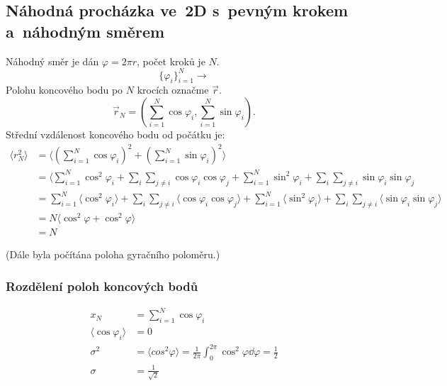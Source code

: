 \documentclass[a4paper]{article}
\begin{document}
\subsection{Náhodná procházka ve~2D s~pevným krokem a~náhod\-ným směrem}
\newcommand\sumN{\sum_{i=1}^N}
\newcommand\mean[1]{\langle #1 \rangle}
Náhodný směr je dán $\varphi = 2 \pi r$, počet kroků je $N$.
\begin{equation}
    \{\varphi_i\}_{i=1}^N \rightarrow
\end{equation}
Polohu koncového bodu po $N$ krocích označme $\vec r$.
\begin{equation}
    \vec{r}_N = \left(
        \sum_{i=1}^N \cos\varphi_i, \sum_{i=1}^N \sin\varphi_i
        \right).
    \end{equation}
Střední vzdálenost koncového bodu od počátku je:
\begin{align}
    \langle r_N^2 \rangle &= \langle
        \left(\sum_{i=1}^N \cos\varphi_i\right)^2
        + \left(\sum_{i=1}^N \sin\varphi_i\right)^2
    \rangle
    \\
    &= \langle \sumN \cos^2 \varphi_i
        + \sum_i\sum_{j \ne i} \cos\varphi_i\cos\varphi_j
        + \sumN \sin^2 \varphi_i
        + \sum_i\sum_{j \ne i} \sin\varphi_i\sin\varphi_j
    \\
    &= \sumN \mean{\cos^2 \varphi_i}
        + \sum_i\sum_{j \ne i} \mean{\cos\varphi_i\cos\varphi_j}
        + \sumN \mean{\sin^2 \varphi_i}
        + \sum_i\sum_{j \ne i} \mean{\sin\varphi_i\sin\varphi_j}
    \\
    &= N \mean{\cos^2\varphi + \cos^2\varphi}
    \\
    &= N
\end{align}

(Dále byla počítána poloha gyračního poloměru.)

\subsubsection{Rozdělení poloh koncových bodů}
\begin{align}
    x_N &= \sumN \cos\varphi_i
    \\
    \mean{\cos\varphi_i} &= 0
    \\
    \sigma^2 &= \mean{cos^2\varphi}
        = \frac{1}{2\pi} \int_0^{2\pi} \cos^2\varphi \dd{\varphi} = \frac12
    \\
    \sigma &= \frac{1}{\sqrt{2}}
\end{align}

\end{document}

